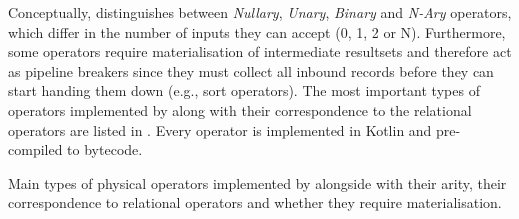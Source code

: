 Conceptually, \cottontail{} distinguishes between \emph{Nullary}, \emph{Unary}, \emph{Binary} and \emph{N-Ary} operators, which differ in the number of inputs they can accept (0, 1, 2 or N). Furthermore, some operators require materialisation of intermediate resultsets and therefore act as pipeline breakers since they must collect all inbound records before they can start handing them down (e.g., sort operators). The most important types of operators implemented by \cottontail{} along with their correspondence to the relational operators are listed in . Every operator is implemented in Kotlin and pre-compiled to bytecode.

\begin{table}
    \caption{Main types of physical operators implemented by \cottontail{} alongside with their arity, their correspondence to relational operators and whether they require materialisation.}
    \label{table:cottontail_operators}


\end{table}
